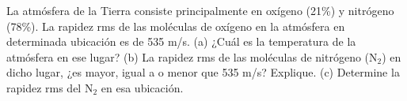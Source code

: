 \item La atmósfera de la Tierra consiste principalmente en oxígeno (21\%) y nitrógeno (78\%). La rapidez rms de las moléculas de oxígeno en la atmósfera en determinada ubicación es de 535 m/s. (a) ¿Cuál es la temperatura de la atmósfera en ese lugar? (b) La rapidez rms de las moléculas de nitrógeno ($\text{N}_2$) en dicho lugar, ¿es mayor, igual a o menor que 535 m/s? Explique. (c) Determine la rapidez rms del $\text{N}_2$ en esa ubicación.
